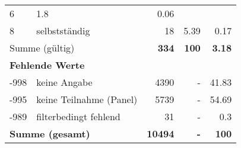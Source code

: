 \begin{longtable}{lXrrr}
       \num{6} &
       \num[round-mode=places,round-precision=2]{1,8} &
         \num[round-mode=places,round-precision=2]{0,06} \\

     8 &
     \multicolumn{1}{X}{ selbstständig   } &


       \num{18} &
       \num[round-mode=places,round-precision=2]{5,39} &
         \num[round-mode=places,round-precision=2]{0,17} \\
     \midrule
     \multicolumn{2}{l}{Summe (gültig)} &
       \textbf{\num{334}} &
     \textbf{100} &
       \textbf{\num[round-mode=places,round-precision=2]{3,18}} \\
     \multicolumn{5}{l}{\textbf{Fehlende Werte}}\\
       -998 &
       keine Angabe &
         \num{4390} &
        - &
         \num[round-mode=places,round-precision=2]{41,83} \\
       -995 &
       keine Teilnahme (Panel) &
         \num{5739} &
        - &
         \num[round-mode=places,round-precision=2]{54,69} \\
       -989 &
       filterbedingt fehlend &
         \num{31} &
        - &
         \num[round-mode=places,round-precision=2]{0,3} \\
     \midrule
     \multicolumn{2}{l}{\textbf{Summe (gesamt)}} &
          \textbf{\num{10494}} &
        \textbf{-} &
        \textbf{100} \\
     \bottomrule
     \end{longtable}
     
